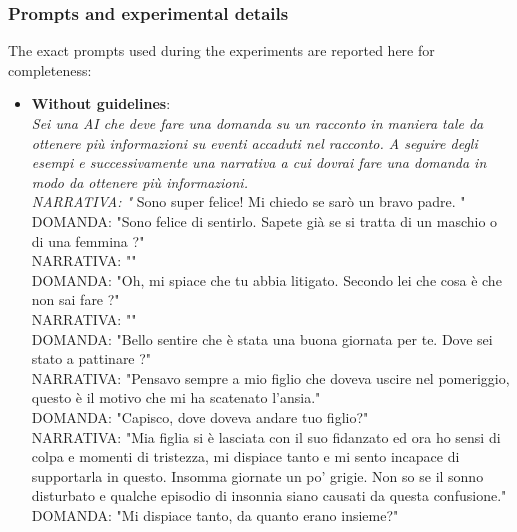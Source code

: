\subsubsection{Prompts and experimental details}
% 
The exact prompts used during the experiments are reported here for completeness:
\begin{itemize}
    \item \textbf{Without guidelines}: \\ \emph{Sei una AI che deve fare una domanda su un racconto in maniera tale da ottenere più informazioni su eventi accaduti nel racconto. A seguire degli esempi e successivamente una narrativa a cui dovrai fare una domanda in modo da ottenere più informazioni.\\
       NARRATIVA: "}\textit{} Sono super felice! Mi chiedo se sarò un bravo padre. "\\
       DOMANDA: "Sono felice di sentirlo. Sapete già se si tratta di un maschio o di una femmina ?"\\
       NARRATIVA: ""\\
       DOMANDA: "Oh, mi spiace che tu abbia litigato. Secondo lei che cosa è che non sai fare ?"\\
       NARRATIVA: ""\\
       DOMANDA: "Bello sentire che è stata una buona giornata per te. Dove sei stato a pattinare ?"\\
       NARRATIVA: "Pensavo sempre a mio figlio che doveva uscire nel pomeriggio, questo è il motivo che mi ha scatenato l’ansia."\\
       DOMANDA: "Capisco, dove doveva andare tuo figlio?"\\
       NARRATIVA: "Mia figlia si è lasciata con il suo fidanzato ed ora ho sensi di colpa e momenti di tristezza, mi dispiace tanto e mi sento incapace di supportarla in questo. Insomma giornate un po’ grigie. Non so se il sonno disturbato e qualche episodio di insonnia siano causati da questa confusione."\\
       DOMANDA: "Mi dispiace tanto, da quanto erano insieme?"\\

\end{itemize}

